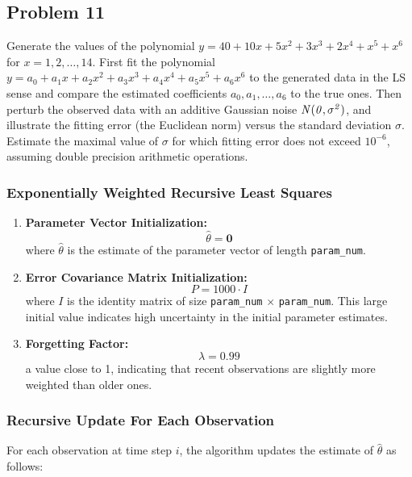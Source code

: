 \subsection{Problem 11}%
\label{sec:problem_11}
Generate the values of the polynomial $y = 40 + 10x + 5x^2 + 3x^3 + 2x^4 + x^5 + x^6$
for $x = 1, 2, \ldots, 14$.
First fit the polynomial $y = a_0 + a_1x + a_2x^2 + a_3x^3 + a_4x^4 + a_5x^5 + a_6x^6$
to the generated data in the LS sense and compare the estimated coefficients
$a_0, a_1, \ldots, a_6$ to the true ones.
Then perturb the observed data with an additive Gaussian noise $\it{N}(0,\sigma^2)$, and
illustrate the fitting error (the Euclidean norm) versus the standard deviation $\sigma$.
Estimate the maximal value of $\sigma$ for which fitting error does not exceed $10^{-6}$,
assuming double precision arithmetic operations.


\subsubsection*{Exponentially Weighted Recursive Least Squares}
\begin{enumerate}
    \item \textbf{Parameter Vector Initialization:}
    \[ \hat{\theta} = \mathbf{0} \]
    where \( \hat{\theta} \) is the estimate of the parameter vector of length \texttt{param\_num}.
    
    \item \textbf{Error Covariance Matrix Initialization:}
    \[ P = 1000 \cdot I \]
    where \( I \) is the identity matrix of size \texttt{param\_num} $\times$ \texttt{param\_num}. This large initial value indicates high uncertainty in the initial parameter estimates.
    
    \item \textbf{Forgetting Factor:}
    \[ \lambda = 0.99 \]
    a value close to 1, indicating that recent observations are slightly more weighted than older ones.
\end{enumerate}

\subsubsection*{Recursive Update For Each Observation}

For each observation at time step \(i\), the algorithm updates the estimate of \( \hat{\theta} \) as follows:

